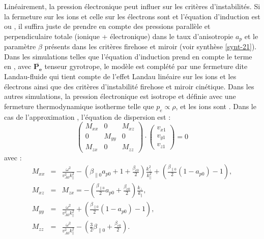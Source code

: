 Linéairement, la pression électronique peut influer sur les critères d'instabilités. Si la fermeture sur les ions et celle sur les électrons sont  et l'équation d'induction est  ou , il suffira juste de prendre en compte des pressions parallèle et perpendiculaire totale (ionique + électronique) dans le taux d'anisotropie $a_p$ et le paramètre $\beta$ présents dans les critères firehose et miroir (voir synthèse \ref{synt-21}). Dans les simulations telles que l'équation d'induction prend en compte le terme en , avec $\overline{\boldsymbol{P_{e}}}$ tenseur gyrotrope, le modèle est complété par une fermeture dite Landau-fluide qui tient compte de l'effet Landau linéaire sur les ions et les électrons ainsi que des critères d'instabilité firehose et miroir cinétique. Dans les autres simulations, la pression électronique est isotrope et définie avec une fermeture thermodynamique isotherme telle que  $p_e \propto \rho$,  et les ions sont . Dans le cas de l'approximation , l'équation de dispersion est : 
\begin{equation}
    \begin{pmatrix}
\label{eq:lin_cpgpe_eqdis}    M_{xx}  & 0 & M_{xz} \\
    0 & M_{yy}   & 0 \\
     M_{zx} & 0 & M_{zz} 
    \end{pmatrix} 
    \cdot \begin{pmatrix}
    v_{x1} \\ v_{y1} \\ v_{z1}
    \end{pmatrix} = 0
\end{equation}
avec : 
\begin{equation*}\begin{array}{rcl}
    M_{xx} &=& \frac{\omega^2}{v^2_{A0}k^2_{\parallel}} -  \left(\beta_{\parallel 0} a_{p0}+1 + \frac{\beta_{e0}}{2}\right)  \frac{k^2_{\perp}}{k^2_{\parallel}} +   \left(\frac{\beta_{\parallel 0}}{2} \left(1-a_{p0}\right)-1\right),\\
    M_{xz} &=&  M_{zx} = -  \left(\frac{\beta_{\parallel 0}}{2} a_{p0} + \frac{\beta_{e0}}{2}\right)\frac{k_{\perp}}{k_{\parallel}},\\
    M_{yy} &=&  \frac{\omega^2}{v^2_{A0}k^2_{\parallel}} +   \left(\frac{\beta_{\parallel 0}}{2} \left(1-a_{p0}\right)-1\right),\\
     M_{zz} &=& \frac{\omega^2}{ v^2_{A0}k^2_{\parallel}} -  \left(\frac{3}{2} \beta_{\parallel 0} + \frac{\beta_{e0}}{2}\right) .
\end{array}\end{equation*}

